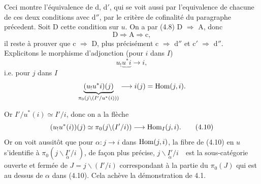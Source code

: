 \dgrchunkbegin

Ceci montre l'équivalence de d, d$'$, qui se voit aussi par l'equivalence de chacune de ces deux conditions avec d$''$, par le critère de cofinalité du paragraphe précedent. Soit D cette condition sur $u$. On a par (4.8) D $\Longrightarrow$ A, donc %
\[
\mathrm{D} \Longrightarrow \mathrm{A} \Longrightarrow \mathrm{c},
\]
il reste à prouver que c $\Longrightarrow$ D, plus précisément c $\Longrightarrow$ d$''$ et c$'$ $\Longrightarrow$ d$''$. Explicitons le morphisme d'adjonction (pour $i$ dans $I$)
\[
u_!\underbrace{u^*i} \longrightarrow i,
\]
i.e. pour $j$ dans $I$
\[
\underbrace{(u_!u^*i)(j)}_{\pi_0(j\backslash(I'/u^*(i)))} \longrightarrow i(j) = \operatorname{Hom}(j,i).
\]

Or $I'/u^*(i) \simeq I'/i$, donc on a la flèche
\[
(u_!u^*(i))(j) \simeq \pi_0(j\backslash(I'/i)) \longrightarrow \operatorname{Hom}_I(j,i). \tag*{(4.10)}
\]
Or on voit aussitôt que pour $\alpha : j \longrightarrow i$ dans $\operatorname{Hom}(j,i)$, la fibre de (4.10) en $u$ s'identifie à $\pi_0(j\backslash\underset{\alpha}{I'}/i\ )$, de façon plus précise, $j\backslash\underset{\alpha}{I'}/i$\ \ est la sous-catégorie ouverte et fermée de $J = j\backslash(I'/i)$ correspondant à la partie du $\pi_0(J)$ qui est au dessus de $\alpha$ dans (4.10). Cela achève la démonstration de 4.1.

